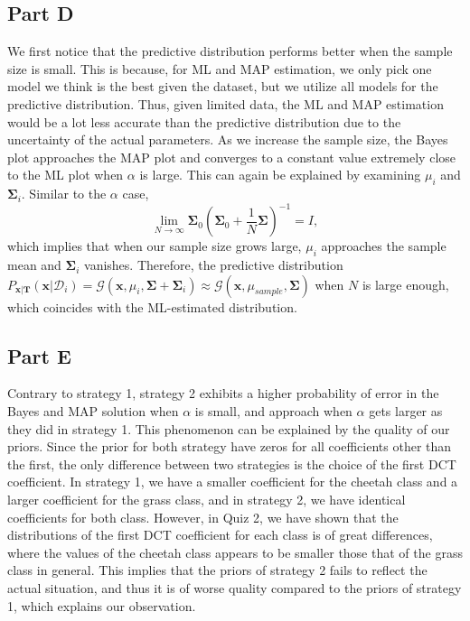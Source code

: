 \documentclass{article}
\newcommand*{\G}{\mathcal{G}}
\newcommand*{\D}{\mathcal{D}}
\begin{document}
\subsection*{Part D}

We first notice that the predictive distribution performs better when the sample size is small.
This is because, for ML and MAP estimation, we only pick one model we think is the best given the dataset, but we utilize all models for the predictive distribution.
Thus, given limited data, the ML and MAP estimation would be a lot less accurate than the predictive distribution due to the uncertainty of the actual parameters.
As we increase the sample size, the Bayes plot approaches the MAP plot and converges to a constant value extremely close to the ML plot when $\alpha$ is large.
This can again be explained by examining $\mu_i$ and $\mathbf{\Sigma}_i$.
Similar to the $\alpha$ case, 
\[
    \lim\limits_{N \to \infty} \mathbf{\Sigma}_0\left(\mathbf{\Sigma}_0 + \frac{1}{N}\mathbf{\Sigma}\right)^{-1} = I,
\]
which implies that when our sample size grows large, $\mu_i$ approaches the sample mean and $\mathbf{\Sigma}_i$ vanishes.
Therefore, the predictive distribution $P_{\mathbf{x}|\mathbf{T}}(\mathbf{x}|\D_i) = \G(\mathbf{x}, \mu_i, \mathbf{\Sigma} + \mathbf{\Sigma}_i) \approx \G(\mathbf{x}, \mu_{sample}, \mathbf{\Sigma})$ when $N$ is large enough, which coincides with the ML-estimated distribution.

\subsection*{Part E}

Contrary to strategy 1, strategy 2 exhibits a higher probability of error in the Bayes and MAP solution when $\alpha$ is small, and approach when $\alpha$ gets larger as they did in strategy 1.
This phenomenon can be explained by the quality of our priors.
Since the prior for both strategy have zeros for all coefficients other than the first, the only difference between two strategies is the choice of the first DCT coefficient.
In strategy 1, we have a smaller coefficient for the cheetah class and a larger coefficient for the grass class, and in strategy 2, we have identical coefficients for both class.
However, in Quiz 2, we have shown that the distributions of the first DCT coefficient for each class is of great differences, where the values of the cheetah class appears to be smaller those that of the grass class in general.
This implies that the priors of strategy 2 fails to reflect the actual situation, and thus it is of worse quality compared to the priors of strategy 1, which explains our observation.
\end{document}
